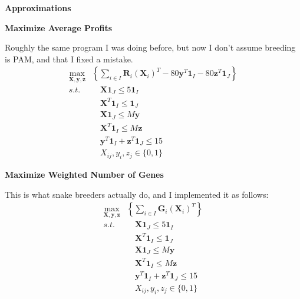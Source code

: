 \documentclass[grey,handout]{beamer}
\renewcommand{\frametitle}[1]{\begin{center}\textbf{#1}\end{center}}
\begin{document}
\begin{frame}
  \frametitle{Approximations}
  \end{frame}
  \begin{frame}
  \frametitle{Maximize Average Profits}
  Roughly the same program I was doing before, but now I don't assume breeding is PAM, and that I fixed a mistake.
  \begin{align*}
      \max_{\mathbf{X},\mathbf{y},\mathbf{z}}&\left\{ \sum_{i\in I}\mathbf R_i (\mathbf X_i)^T - 80\mathbf y^T\mathbf 1_I - 80\mathbf z^T\mathbf 1_J \right\}\\
      s.t. & \quad\mathbf X\mathbf 1_J \leq 5\mathbf 1_I \\
      &\quad \mathbf X^T \mathbf 1_I \leq \mathbf1_J\\
      &\quad \mathbf X \mathbf1_J\leq M\mathbf y\\
      & \quad\mathbf X^T\mathbf 1_I \leq M\mathbf z\\
      &\quad \mathbf y^T\mathbf 1_I + \mathbf z^T\mathbf 1_J \leq 15\\
      & \quad X_{ij}, y_i, z_j \in \{0,1\}
    \end{align*}
    \end{frame}
    \begin{frame}
    \frametitle{Maximize Weighted Number of Genes}
    This is what snake breeders actually do, and I implemented it as follows:
    \begin{align*}
    \max_{\mathbf{X},\mathbf{y},\mathbf{z}}&\left\{ \sum_{i\in I}\mathbf G_i (\mathbf X_i)^T  \right\}\\
      s.t. & \quad\mathbf X\mathbf 1_J \leq 5\mathbf 1_I \\
      &\quad \mathbf X^T \mathbf 1_I \leq \mathbf1_J\\
      &\quad \mathbf X \mathbf1_J\leq M\mathbf y\\
      & \quad\mathbf X^T\mathbf 1_I \leq M\mathbf z\\
      &\quad \mathbf y^T\mathbf 1_I + \mathbf z^T\mathbf 1_J \leq 15\\
      & \quad X_{ij}, y_i, z_j \in \{0,1\}
    \end{align*}
    \end{frame}
\end{document}

